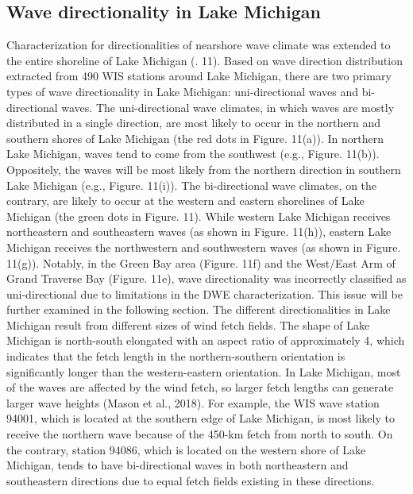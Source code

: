 \subsection{Wave directionality in Lake Michigan}
\label{Wave directionality in Lake Michigan}

Characterization for directionalities of nearshore wave climate was extended to the entire shoreline of Lake Michigan (. 11). Based on wave direction distribution extracted from 490 WIS stations around Lake Michigan, there are two primary types of wave directionality in Lake Michigan: uni-directional waves and bi-directional waves. The uni-directional wave climates, in which waves are mostly distributed in a single direction, are most likely to occur in the northern and southern shores of Lake Michigan (the red dots in Figure. 11(a)). In northern Lake Michigan, waves tend to come from the southwest (e.g., Figure. 11(b)). Oppositely, the waves will be most likely from the northern direction in southern Lake Michigan (e.g., Figure. 11(i)). The bi-directional wave climates, on the contrary, are likely to occur at the western and eastern shorelines of Lake Michigan (the green dots in Figure. 11). While western Lake Michigan receives northeastern and southeastern waves (as shown in Figure. 11(h)), eastern Lake Michigan receives the northwestern and southwestern waves (as shown in Figure. 11(g)). Notably, in the Green Bay area (Figure. 11f) and the West/East Arm of Grand Traverse Bay (Figure. 11e), wave directionality was incorrectly classified as uni-directional due to limitations in the DWE characterization. This issue will be further examined in the following section. The different directionalities in Lake Michigan result from different sizes of wind fetch fields. The shape of Lake Michigan is north-south elongated with an aspect ratio of approximately 4, which indicates that the fetch length in the northern-southern orientation is significantly longer than the western-eastern orientation. In Lake Michigan, most of the waves are affected by the wind fetch, so larger fetch lengths can generate larger wave heights (Mason et al., 2018). For example, the WIS wave station 94001, which is located at the southern edge of Lake Michigan, is most likely to receive the northern wave because of the 450-km fetch from north to south. On the contrary, station 94086, which is located on the western shore of Lake Michigan, tends to have bi-directional waves in both northeastern and southeastern directions due to equal fetch fields existing in these directions. 

